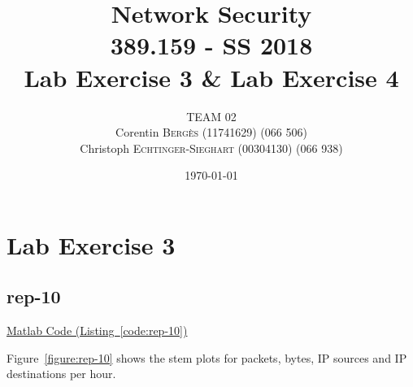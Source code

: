 \documentclass{article}
\title{Network Security \\ 389.159 - SS 2018 \\ Lab Exercise 3 \& Lab Exercise 4} %
\author{
    TEAM 02 \\
    Corentin \textsc{Bergès} (11741629) (066 506) \\
    Christoph \textsc{Echtinger-Sieghart} (00304130) (066 938)
}
\date{\today} %
\newcommand{\codelink}[1]{%
    \hyperref[#1]{Matlab Code (Listing~\ref{#1})}%
}
\begin{document}
\maketitle %
\renewcommand{\arraystretch}{2} %

\listoffixmes

\section{Lab Exercise 3}

\subsection{rep-10 }

\codelink{code:rep-10}

Figure~\ref{figure:rep-10} shows the stem plots for packets, bytes, IP sources and IP destinations
per hour.
\end{document}
